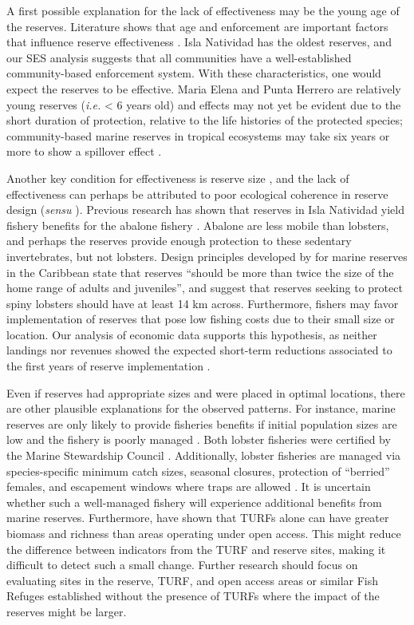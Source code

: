 \documentclass{frontiersSCNS}
\begin{document}
A first possible explanation for the lack of effectiveness may be the
young age of the reserves. Literature shows that age and enforcement are
important factors that influence reserve effectiveness
\citep{edgar_2014-UO,babcock_2010}. Isla Natividad has the oldest
reserves, and our SES analysis suggests that all communities have a
well-established community-based enforcement system. With these
characteristics, one would expect the reserves to be effective. Maria
Elena and Punta Herrero are relatively young reserves (\emph{i.e.}
\textless{} 6 years old) and effects may not yet be evident due to the
short duration of protection, relative to the life histories of the
protected species; community-based marine reserves in tropical
ecosystems may take six years or more to show a spillover effect
\citep{dasilva_2015-zX}.

Another key condition for effectiveness is reserve size
\citep{edgar_2014-UO}, and the lack of effectiveness can perhaps be
attributed to poor ecological coherence in reserve design (\emph{sensu}
\citet{rees_2018}). Previous research has shown that reserves in Isla
Natividad yield fishery benefits for the abalone fishery
\citep{rossetto_2015-V0}. Abalone are less mobile than lobsters, and
perhaps the reserves provide enough protection to these sedentary
invertebrates, but not lobsters. Design principles developed by
\citet{green_2017} for marine reserves in the Caribbean state that
reserves ``should be more than twice the size of the home range of
adults and juveniles'', and suggest that reserves seeking to protect
spiny lobsters should have at least 14 km across. Furthermore, fishers
may favor implementation of reserves that pose low fishing costs due to
their small size or location. Our analysis of economic data supports
this hypothesis, as neither landings nor revenues showed the expected
short-term reductions associated to the first years of reserve
implementation \citep{ovando_2016-Wg}.

Even if reserves had appropriate sizes and were placed in optimal
locations, there are other plausible explanations for the observed
patterns. For instance, marine reserves are only likely to provide
fisheries benefits if initial population sizes are low and the fishery
is poorly managed \citep{hilborn_2004,hilborn_2006}. Both lobster
fisheries were certified by the Marine Stewardship Council
\citep{prezramrez_2016-J1}. Additionally, lobster fisheries are managed
via species-specific minimum catch sizes, seasonal closures, protection
of ``berried'' females, and escapement windows where traps are allowed
\citep{dof_website_1993}. It is uncertain whether such a well-managed
fishery will experience additional benefits from marine reserves.
Furthermore, \citet{gelcich_2008} have shown that TURFs alone can have
greater biomass and richness than areas operating under open access.
This might reduce the difference between indicators from the TURF and
reserve sites, making it difficult to detect such a small change.
Further research should focus on evaluating sites in the reserve, TURF,
and open access areas or similar Fish Refuges established without the
presence of TURFs where the impact of the reserves might be larger.
\end{document}
